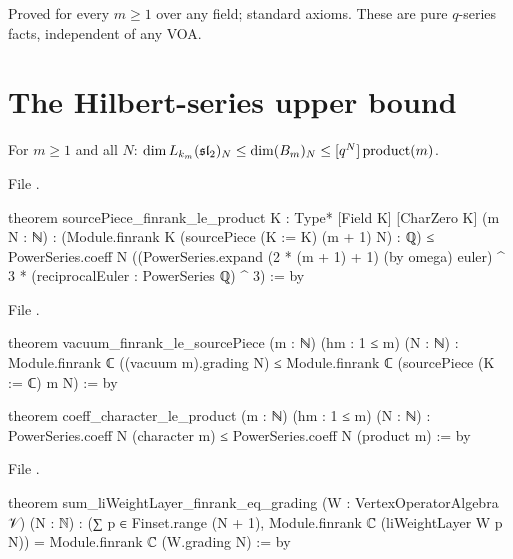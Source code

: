 \begin{status}
Proved for every $m\ge1$ over any field; standard axioms. These are pure $q$-series facts, independent of any
VOA.
\end{status}

\section{The Hilbert-series upper bound}\label{l20:sec:m5}

\begin{theorem}\label{l20:thm:upper}
For $m\ge1$ and all $N$: $\dim L_{k_m}(\mathfrak{sl}_2)_N\le\dim(B_m)_N\le[q^N]\,\mathrm{product}(m)$.
\end{theorem}
\noindent File .
\begin{leancode}
theorem sourcePiece_finrank_le_product {K : Type*} [Field K] [CharZero K] (m N : ℕ) :
    (Module.finrank K (sourcePiece (K := K) (m + 1) N) : ℚ) ≤
      PowerSeries.coeff N ((PowerSeries.expand (2 * (m + 1) + 1) (by omega) euler) ^ 3 *
        (reciprocalEuler : PowerSeries ℚ) ^ 3) := by
\end{leancode}
\noindent File .
\begin{leancode}
theorem vacuum_finrank_le_sourcePiece (m : ℕ) (hm : 1 ≤ m) (N : ℕ) :
    Module.finrank ℂ ((vacuum m).grading N) ≤
      Module.finrank ℂ (sourcePiece (K := ℂ) m N) := by

theorem coeff_character_le_product (m : ℕ) (hm : 1 ≤ m) (N : ℕ) :
    PowerSeries.coeff N (character m) ≤ PowerSeries.coeff N (product m) := by
\end{leancode}
\noindent File .
\begin{leancode}
theorem sum_liWeightLayer_finrank_eq_grading (W : VertexOperatorAlgebra 𝒱) (N : ℕ) :
    (∑ p ∈ Finset.range (N + 1), Module.finrank ℂ (liWeightLayer W p N)) =
      Module.finrank ℂ (W.grading N) := by
\end{leancode}

